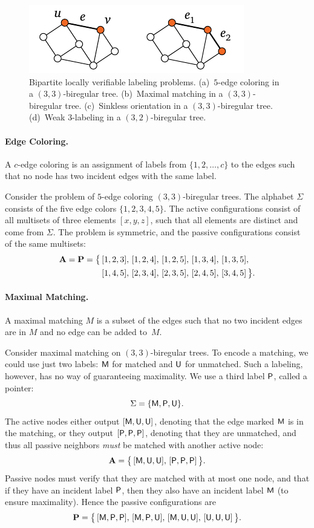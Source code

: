 \begin{figure}
	\centering
	\includegraphics[page=\PBipartiteModelExamples,scale=0.3]{figs.pdf}
	\caption{Bipartite locally verifiable labeling problems. (a)~$5$-edge coloring in a $(3,3)$-biregular tree. (b)~Maximal matching in a $(3,3)$-biregular tree. (c)~Sinkless orientation in a $(3,3)$-biregular tree. (d)~Weak 3-labeling in a $(3,2)$-biregular tree.} \label{fig:bipartite-problem-examples}
\end{figure}

\paragraph{Edge Coloring.} A $c$-edge coloring is an assignment of labels from $\{1,2,\dotsc,c\}$ to the edges such that no node has two incident edges with the same label. 

Consider the problem of $5$-edge coloring $(3,3)$-biregular trees. The alphabet $\Sigma$ consists of the five edge colors $\{ 1, 2, 3, 4, 5 \}$. The active configurations consist of all multisets of three elements $[x,y,z]$, such that all elements are distinct and come from $\Sigma$. The problem is symmetric, and the passive configurations consist of the same multisets:
\[
\begin{split}
	\mathbf{A} = \mathbf{P} = \bigl\{\,
		&[1,2,3],\,
		[1,2,4],\,
		[1,2,5],\,
		[1,3,4],\,
		[1,3,5], \\
		&[1,4,5],\,
		[2,3,4],\,
		[2,3,5],\,
		[2,4,5],\,
		[3,4,5]
	\,\bigr\}.
\end{split}
\]

\paragraph{Maximal Matching.} A maximal matching $M$ is a subset of the edges such that no two incident edges are in $M$ and no edge can be added to~$M$.

Consider maximal matching on $(3,3)$-biregular trees. To encode a matching, we could use just two labels: $\mathsf{M}$ for matched and $\mathsf{U}$ for unmatched. Such a labeling, however, has no way of guaranteeing maximality. We use a third label $\mathsf{P}$, called a pointer:
\[
	\Sigma = \{ \mathsf{M}, \mathsf{P}, \mathsf{U} \}.
\]
The active nodes either output $[ \mathsf{M}, \mathsf{U}, \mathsf{U} ]$, denoting that the edge marked $\mathsf{M}$ is in  the matching, or they output $[\mathsf{P}, \mathsf{P}, \mathsf{P}]$, denoting that they are unmatched, and thus all passive neighbors \emph{must} be matched with another active node:
\[
	\mathbf{A} = \bigl\{\, [ \mathsf{M}, \mathsf{U}, \mathsf{U} ], \, [\mathsf{P}, \mathsf{P}, \mathsf{P}] \, \bigr\}.
\]
Passive nodes must verify that they are matched with at most one node, and that if they have an incident label $\mathsf{P}$, then they also have an incident label $\mathsf{M}$ (to ensure maximality). Hence the passive configurations are
\[
	\mathbf{P} = \bigl\{\,
		[ \mathsf{M}, \mathsf{P}, \mathsf{P} ],\,
		[ \mathsf{M}, \mathsf{P}, \mathsf{U} ],\,
		[ \mathsf{M}, \mathsf{U}, \mathsf{U} ],\,
		[ \mathsf{U}, \mathsf{U}, \mathsf{U} ]
	\,\bigr\}.
\]

